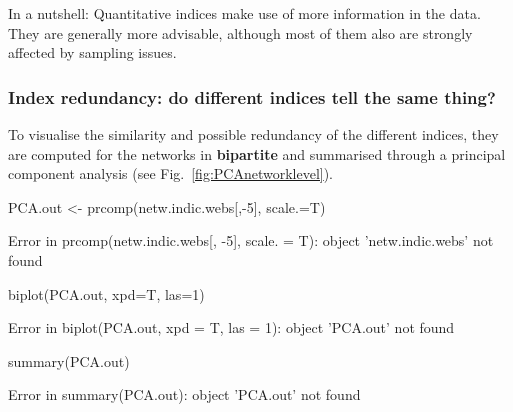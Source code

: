 \documentclass[a4paper, 11pt]{article}\usepackage[]{graphicx}\usepackage[]{color}
\newcommand{\package}[1]{\textbf{#1}}
\begin{document}
In a nutshell: Quantitative indices make use of more information in the data. They are generally more advisable, although most of them also are strongly affected by sampling issues.



\subsubsection{Index redundancy: do different indices tell the same thing?}

To visualise the similarity and possible redundancy of the different indices, they are computed for the networks in \package{bipartite} and summarised through a principal component analysis (see Fig.~\ref{fig:PCAnetworklevel}).
\begin{Schunk}
\end{Schunk}

\begin{Schunk}
\begin{Sinput}
PCA.out <- prcomp(netw.indic.webs[,-5], scale.=T)
\end{Sinput}
\begin{Soutput}
Error in prcomp(netw.indic.webs[, -5], scale. = T): object 'netw.indic.webs' not found
\end{Soutput}
\begin{Sinput}
biplot(PCA.out, xpd=T, las=1)
\end{Sinput}
\begin{Soutput}
Error in biplot(PCA.out, xpd = T, las = 1): object 'PCA.out' not found
\end{Soutput}
\begin{Sinput}
summary(PCA.out)
\end{Sinput}
\begin{Soutput}
Error in summary(PCA.out): object 'PCA.out' not found
\end{Soutput}
\end{Schunk}
\end{document}
